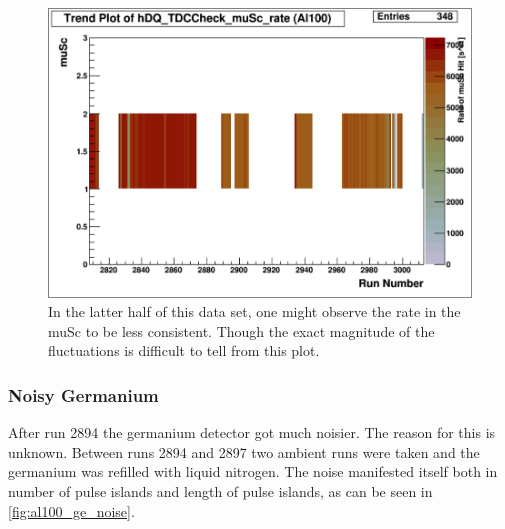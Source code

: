\documentclass[a4paper]{article}
\begin{document}
\begin{figure}
  \includegraphics[width=0.9\linewidth]{figs/al100/musc_rate}
  \caption{In the latter half of this data set, one might
    observe the rate in the muSc to be less consistent. Though
    the exact magnitude of the fluctuations is difficult
    to tell from this plot.}
  \label{fig:al100_musc_rate}
\end{figure}



\subsubsection{Noisy Germanium}
\label{sec:al100_ge_noisy}

After run 2894 the germanium detector got much noisier. The reason for this is unknown.
Between runs 2894 and 2897 two ambient runs were taken and the germanium was refilled with liquid nitrogen.
The noise manifested itself both in number of pulse islands and length of pulse islands, as can be
seen in \ref{fig:al100_ge_noise}. 
\end{document}
